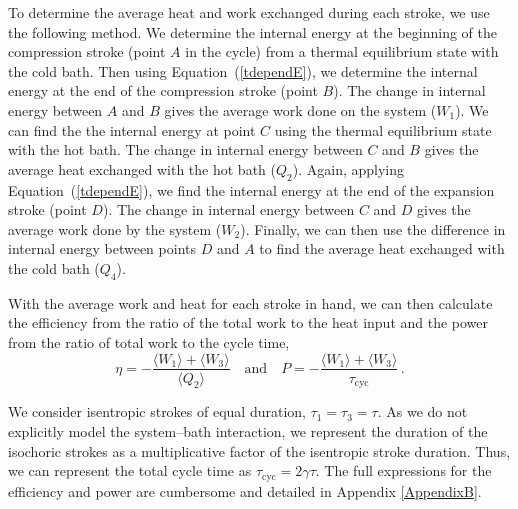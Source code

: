 \documentclass[preprints,article,accept,moreauthors,pdftex]{Definitions/mdpi}
\begin{document}
To determine the average heat and work exchanged during each stroke, we use the following method. We determine the internal energy at the beginning of the compression stroke (point $A$ in the cycle) from a thermal equilibrium state with the cold bath. Then using Equation~(\ref{tdependE}), we determine the internal energy at the end of the compression stroke (point $B$). The change in internal energy between $A$ and $B$ gives the average work done on the system ($W_1$). We can find the the internal energy at point $C$ using the thermal equilibrium state with the hot bath. The change in internal energy between $C$ and $B$ gives the average heat exchanged with the hot bath ($Q_2$). Again, applying Equation~(\ref{tdependE}), we find the internal energy at the end of the expansion stroke (point $D$). The change in internal energy between $C$ and $D$ gives the average work done by the system ($W_2$). Finally, we can then use the difference in internal energy between points $D$ and $A$ to find the average heat exchanged with the cold bath ($Q_4$).      

With the average work and heat for each stroke in hand, we can then calculate the efficiency from the ratio of the total work to the heat input and the power from the ratio of total work to the cycle time,    
\begin{equation}
	\eta = -\frac{\langle W_1 \rangle + \langle W_3 \rangle}{\langle Q_2 \rangle} \quad \text{and}\quad P = -\frac{\langle W_1 \rangle + \langle W_3 \rangle}{\tau_{\mathrm{cyc}}}\,.
\end{equation}

We consider isentropic strokes of equal duration, $\tau_1 = \tau_3 = \tau$. As we do not explicitly model the system--bath interaction, we represent the duration of the isochoric strokes as a multiplicative factor of the isentropic stroke duration. Thus, we can represent the total cycle time as $\tau_{\mathrm{cyc}} = 2\gamma\tau$. The full expressions for the efficiency and power are cumbersome and detailed in Appendix \ref{AppendixB}. 
\end{document}
